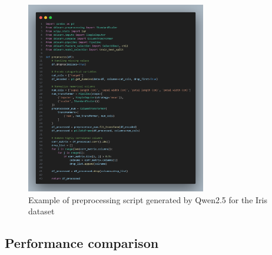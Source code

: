 \begin{figure}[H]
    \centering
    \includegraphics[width=0.7\textwidth]{media/Qwen2.5codeIRIS.png}
    \caption{Example of preprocessing script generated by Qwen2.5 for the Iris dataset}
    \label{fig:application-driven-preprocessing-iris}
\end{figure}

\subsection{Performance comparison}



